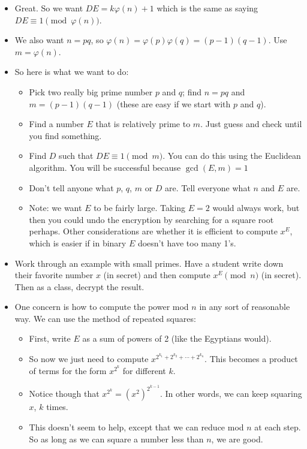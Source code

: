 \documentclass[12pt]{article}
\theoremstyle{plain}
\theoremstyle{definition}
\theoremstyle{remark}
\begin{document}
\begin{itemize}
  \item Great.  So we want $DE = k\varphi(n) + 1$ which is the same as saying $DE \equiv 1 \pmod{\varphi(n)}$. 
  \item We also want $n = pq$, so $\varphi(n) = \varphi(p)\varphi(q) = (p-1)(q-1)$.  Use $m = \varphi(n)$.  
  \item So here is what we want to do:
  \begin{itemize}
    \item Pick two really big prime number  $p$ and $q$; find $n = pq$ and $m = (p-1)(q-1)$  (these are easy if we start with $p$ and $q$).
    \item Find a number $E$ that is relatively prime to $m$.  Just guess and check until you find something.
    \item Find $D$ such that $DE \equiv 1 \pmod{m}$.  You can do this using the Euclidean algorithm.  You will be successful because $\gcd(E, m) = 1$
    \item Don't tell anyone what $p$, $q$, $m$ or $D$ are.  Tell everyone what $n$ and $E$ are.
    \item Note: we want $E$ to be fairly large.  Taking $E = 2$ would always work, but then you could undo the encryption by searching for a square root perhaps.  Other considerations are whether it is efficient to compute $x^E$, which is easier if in binary $E$ doesn't have too many 1's.
  \end{itemize}
  
  \item Work through an example with small primes.  Have a student write down their favorite number $x$ (in secret) and then compute $x^E \pmod n$ (in secret).  Then as a class, decrypt the result.
  
  \item One concern is how to compute the power mod $n$ in any sort of reasonable way.  We can use the method of repeated squares:
  
  \begin{itemize}
    \item First, write $E$ as a sum of powers of 2 (like the Egyptians would).
    \item So now we just need to compute $x^{2^{k_1}+2^{k_2}+ \cdots + 2^{k_n}}$.  This becomes a product of terms for the form $x^{2^k}$ for different $k$.  
    \item Notice though that $x^{2^k} = (x^2)^{2^{k-1}}$.  In other words, we can keep squaring $x$, $k$ times.  
    \item This doesn't seem to help, except that we can reduce mod $n$ at each step.  So as long as we can square a number less than $n$, we are good.
  \end{itemize}
  
  
\end{itemize}
\end{document}
